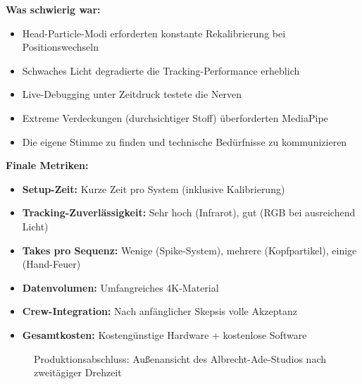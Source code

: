 \textbf{Was schwierig war:}
\begin{itemize}
   \item Head-Particle-Modi erforderten konstante Rekalibrierung bei Positionswechseln
   \item Schwaches Licht degradierte die Tracking-Performance erheblich
   \item Live-Debugging unter Zeitdruck testete die Nerven
   \item Extreme Verdeckungen (durchsichtiger Stoff) überforderten MediaPipe
   \item Die eigene Stimme zu finden und technische Bedürfnisse zu kommunizieren
\end{itemize}

\textbf{Finale Metriken:}
\begin{itemize}
   \item \textbf{Setup-Zeit:} Kurze Zeit pro System (inklusive Kalibrierung)
   \item \textbf{Tracking-Zuverlässigkeit:} Sehr hoch (Infrarot), gut (RGB bei ausreichend Licht)
   \item \textbf{Takes pro Sequenz:} Wenige (Spike-System), mehrere (Kopfpartikel), einige (Hand-Feuer)
   \item \textbf{Datenvolumen:} Umfangreiches 4K-Material
   \item \textbf{Crew-Integration:} Nach anfänglicher Skepsis volle Akzeptanz
   \item \textbf{Gesamtkosten:} Kostengünstige Hardware + kostenlose Software
\end{itemize}

\begin{figure}[htbp]
    \centering
    \caption{Produktionsabschluss: Außenansicht des Albrecht-Ade-Studios nach zweitägiger Drehzeit}
    \label{fig:studio_exterior}
\end{figure}